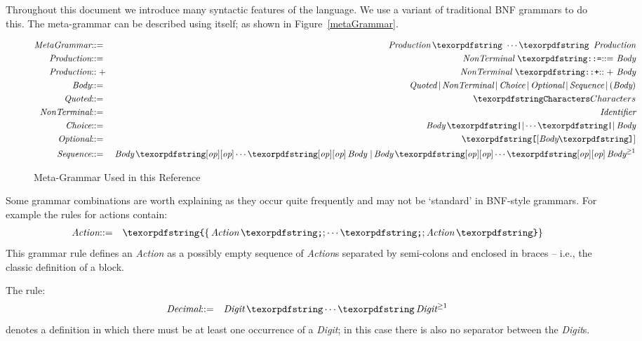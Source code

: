 Throughout this document we introduce many syntactic features of the language. We use a variant of traditional BNF grammars to do this. The meta-grammar can be described using itself; as shown in Figure~\vref{metaGrammar}.

\begin{figure}[htbp]
\begin{eqnarray*}
\emph{MetaGrammar}& \arrow& \emph{Production}\sequence{\,}\emph{Production}\\
\emph{Production} &\arrow& \emph{NonTerminal}\ \q{::=}\ \emph{Body}\\
\emph{Production} &\arrowplus&\emph{NonTerminal}\ \q{::+}\ \emph{Body}\\
\emph{Body} &\arrow& \emph{Quoted}\,\choice\,\emph{NonTerminal}\,\choice\,\emph{Choice}\, \choice\,\emph{Optional}\,\choice\,\emph{Sequence}\,\choice\,( \emph{Body} )\\
\emph{Quoted} &\arrow &\q{Characters}\\
\emph{NonTerminal} &\arrow&\emph{Identifier}\\
\emph{Choice}& \arrow &\emph{Body}\sequence{|}\emph{Body}\\
\emph{Optional} &\arrow &\q{[} \emph{Body} \q{]}\\
\emph{Sequence}&\arrow&\emph{Body}\sequence{\rm[\emph{op}]}\emph{Body}\ \choice\,\emph{Body}\sequence{\rm[\emph{op}]}\emph{Body}\plus
\end{eqnarray*}
\caption{Meta-Grammar Used in this Reference}\label{metaGrammar}
\end{figure}

Some grammar combinations are worth explaining as they occur quite frequently and may not be `standard' in BNF-style grammars. For example the rules for actions contain:
\begin{eqnarray*}
\emph{Action}& \arrow&\q{\{}\, \emph{Action}\sequence{;}\emph{Action}\, \q{\}}
\end{eqnarray*}
This grammar rule defines an \emph{Action} as a possibly empty sequence of \emph{Action}s separated by semi-colons and enclosed in braces -- i.e., the classic definition of a block. 

The rule:
\begin{eqnarray*}
\emph{Decimal}& \arrow&\emph{Digit}\sequence{}\emph{Digit}\plus
\end{eqnarray*}
denotes a definition in which there must be at least one occurrence of a \emph{Digit}; in this case there is also no separator between the \emph{Digit}s.


